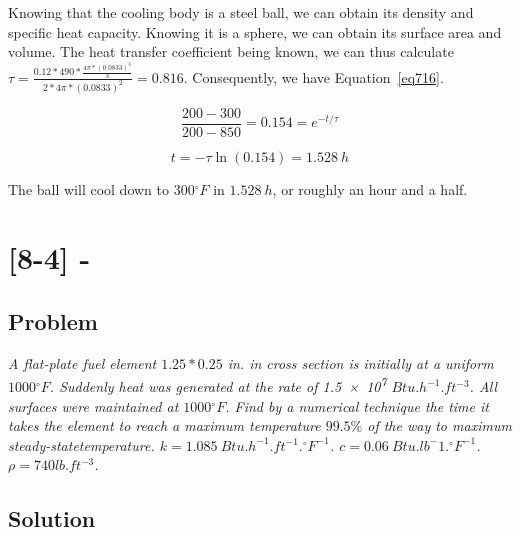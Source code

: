 Knowing that the cooling body is a steel ball, we can obtain its density and specific heat capacity. Knowing it is a sphere, we can obtain its surface area and volume. The heat transfer coefficient being known, we can thus calculate $\tau = \frac{0.12 * 490 * \frac{4\pi * (0.0833)^3}{3}}{2 * 4\pi * (0.0833)^2} = 0.816$. Consequently, we have Equation~\ref{eq716}.

\begin{equation}\label{eq716}
\frac{200 - 300}{200 - 850} = 0.154 = e^{-t/\tau}
\end{equation}

\begin{equation}\label{eq717}
t = -\tau \ln (0.154) = 1.528\ h
\end{equation}

The ball will cool down to $300{}^\circ F$ in $1.528\ h$, or roughly an hour and a half.

\section{[8-4] - }
\label{prob74}

\subsection{Problem}
\textit{A flat-plate fuel element $1.25 * 0.25$ in. in cross section is initially at a uniform $1000{}^\circ F$. Suddenly heat was generated at the rate of \num{1.5e7} $Btu.h^{-1}.ft^{-3}$. All surfaces were maintained at $1000{}^\circ F$. Find by a numerical technique the time it takes the element to reach a maximum temperature $99.5\%$ of the way to maximum steady-statetemperature. $k=1.085\ Btu.h^{-1}.ft^{-1}.{}^\circ F^{-1}$. $c = 0.06\ Btu.lb^-1.{}^\circ F^{-1}$. $\rho = 740 lb.ft^{-3}$.}

\subsection{Solution}

